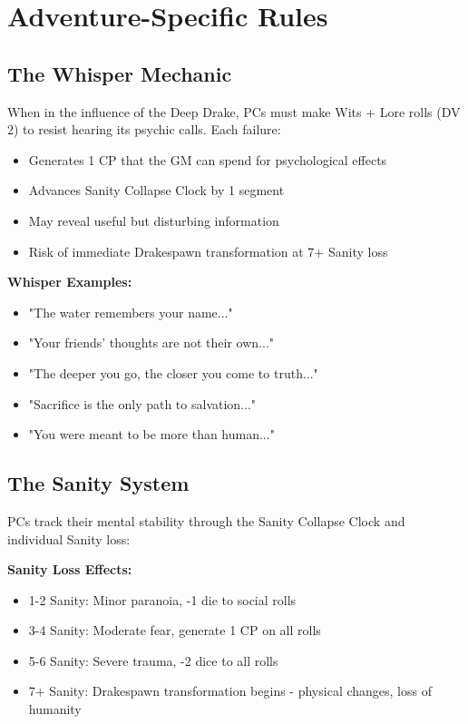 \documentclass[11pt]{article}
\begin{document}
\section{Adventure-Specific Rules}

\subsection{The Whisper Mechanic}

When in the influence of the Deep Drake, PCs must make Wits + Lore rolls (DV 2) to resist hearing its psychic calls. Each failure:
\begin{itemize}
\item Generates 1 CP that the GM can spend for psychological effects
\item Advances Sanity Collapse Clock by 1 segment
\item May reveal useful but disturbing information
\item Risk of immediate Drakespawn transformation at 7+ Sanity loss
\end{itemize}

\textbf{Whisper Examples:}
\begin{itemize}
\item "The water remembers your name..."
\item "Your friends' thoughts are not their own..."
\item "The deeper you go, the closer you come to truth..."
\item "Sacrifice is the only path to salvation..."
\item "You were meant to be more than human..."
\end{itemize}

\subsection{The Sanity System}

PCs track their mental stability through the Sanity Collapse Clock and individual Sanity loss:

\textbf{Sanity Loss Effects:}
\begin{itemize}
\item 1-2 Sanity: Minor paranoia, -1 die to social rolls
\item 3-4 Sanity: Moderate fear, generate 1 CP on all rolls
\item 5-6 Sanity: Severe trauma, -2 dice to all rolls
\item 7+ Sanity: Drakespawn transformation begins - physical changes, loss of humanity
\end{itemize}
\end{document}
